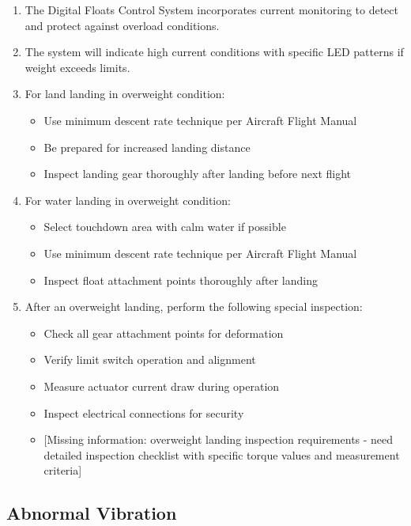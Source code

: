 \documentclass[12pt,a4paper,twoside,openright]{book}
\begin{document}
\begin{enumerate}
    \item The Digital Floats Control System incorporates current monitoring to detect and protect against overload conditions.
    \item The system will indicate high current conditions with specific LED patterns if weight exceeds limits.
    \item For land landing in overweight condition:
    \begin{itemize}
        \item Use minimum descent rate technique per Aircraft Flight Manual
        \item Be prepared for increased landing distance
        \item Inspect landing gear thoroughly after landing before next flight
    \end{itemize}
    \item For water landing in overweight condition:
    \begin{itemize}
        \item Select touchdown area with calm water if possible
        \item Use minimum descent rate technique per Aircraft Flight Manual
        \item Inspect float attachment points thoroughly after landing
    \end{itemize}
    \item After an overweight landing, perform the following special inspection:
\begin{itemize}
        \item Check all gear attachment points for deformation
        \item Verify limit switch operation and alignment
        \item Measure actuator current draw during operation
        \item Inspect electrical connections for security
        \item {\color{red}[Missing information: overweight landing inspection requirements - need detailed inspection checklist with specific torque values and measurement criteria]}
\end{itemize}
\end{enumerate}

\subsection{Abnormal Vibration}
\end{document}
